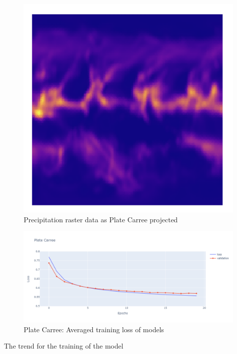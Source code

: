 \begin{figure}[H]
\begin{minipage}{0.30\textwidth}
        \label{fig:eqc_prect_raster}
    \end{minipage}\hfill
    \begin{minipage}{0.30\textwidth}
        \centering
        \includegraphics[width=0.9\linewidth]{figures/chapter-8/plate_caree_prect_raster.png}
        \caption{Precipitation raster data as Plate Carree projected}
        \label{fig:eqc_prect_raster}
    \end{minipage}\hfill
\end{figure}

\begin{figure}[H]
    \centering
    \includegraphics[width=1.0\linewidth]{figures/chapter-8/pc_loss.png}
    \caption{Plate Carree: Averaged training loss of models  }
    \label{fig:pc_loss}
\end{figure}

The trend for the training of the model


